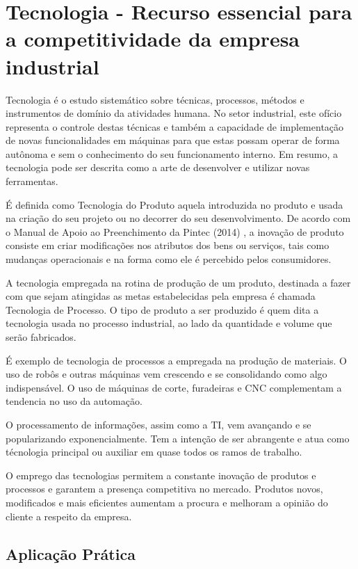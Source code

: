 \chapter{Tecnologia - Recurso essencial para a competitividade da empresa industrial}
\label{chap:tecnologia_recurso}

Tecnologia é o estudo sistemático sobre técnicas, processos, métodos e instrumentos de domínio da atividades humana. No setor industrial, este ofício representa o controle destas técnicas e também a capacidade de implementação de novas funcionalidades em máquinas para que estas possam operar de forma autônoma e sem o conhecimento do seu funcionamento interno. Em resumo, a tecnologia pode ser descrita como a arte de desenvolver e utilizar novas ferramentas.

É definida como Tecnologia do Produto aquela introduzida no produto e usada na criação do seu projeto ou no decorrer do seu desenvolvimento. De acordo com o Manual de Apoio ao Preenchimento da Pintec (2014) %
, a inovação de produto consiste em criar modificações nos atributos dos bens ou serviços, tais como mudanças operacionais e na forma como ele é percebido pelos consumidores.

A tecnologia empregada na rotina de produção de um produto, destinada a fazer com que sejam atingidas as metas estabelecidas pela empresa é chamada Tecnologia de Processo. O tipo de produto a ser produzido é quem dita a tecnologia usada no processo industrial, ao lado da quantidade e volume que serão fabricados.

É exemplo de tecnologia de processos a empregada na produção de materiais. O uso de robôs e outras máquinas vem crescendo e se consolidando como algo indispensável. O uso de máquinas de corte, furadeiras e \ac{CNC} complementam a tendencia no uso da automação.

O processamento de informações, assim como a \ac{TI}, vem avançando e se popularizando exponencialmente. Tem a intenção de ser abrangente e atua como técnologia principal ou auxiliar em quase todos os ramos de trabalho.

O emprego das tecnologias permitem a constante inovação de produtos e processos e garantem a presença competitiva no mercado. Produtos novos, modificados e mais eficientes aumentam a procura e melhoram a opinião do cliente a respeito da empresa.


\section{Aplicação Prática}
\label{sec:tecnologia_recurso_aplicacao}